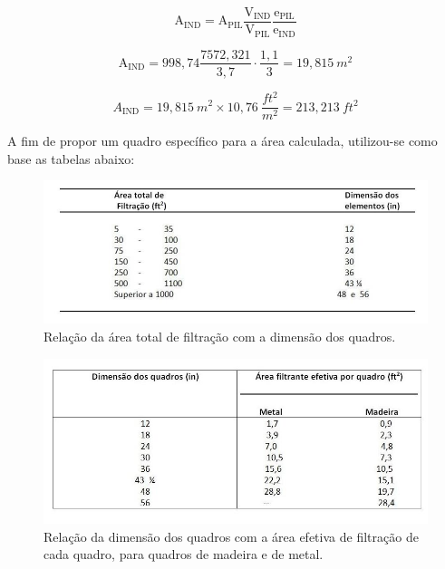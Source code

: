 \begin{equation}\label{key}
\mathrm{A}_{\mathrm{IND}}=\mathrm{A}_{\mathrm{PIL}} \frac{\mathrm{V}_{\mathrm{IND}}}{\mathrm{V}_{\mathrm{PIL}}} \frac{\mathrm{e}_{\mathrm{PIL}}}{\mathrm{e}_{\mathrm{IND}}}
\end{equation}

\begin{equation}\label{key}
\mathrm{A}_{\mathrm{IND}}=998,74 \frac{7572,321}{3,7} \cdot \frac{1,1}{3}=19,815 \ m^{2}
\end{equation}


\begin{equation}\label{key}
A_{\mathrm{IND}}=19,815 \ m^{2} \times 10,76 \ \frac{f t^{2}}{m^{2}}=213,213 \ f t^{2}
\end{equation}

A fim de propor um quadro específico para a área calculada, utilizou-se como base as tabelas abaixo:

\begin{figure}[H]
	\begin{center}
		\includegraphics[scale=.6,trim={0 0 0 0}]{figuras/ladeq/filtra/tabquadro1}
		\caption{Relação da área total de filtração com a dimensão dos quadros.}
		\label{tabqua1}
	\end{center}
\end{figure}



\begin{figure}[H]
	\begin{center}
		\includegraphics[scale=.6,trim={0 0 0 0}]{figuras/ladeq/filtra/tabquadro2}
		\caption{Relação da dimensão dos quadros com a área efetiva de filtração de cada quadro, para quadros de madeira e de metal.}
		\label{tabqua2}
	\end{center}
\end{figure}

